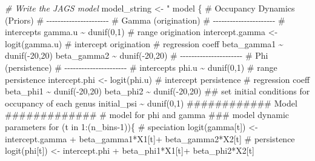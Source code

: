 \documentclass[
]{article}
\newenvironment{Shaded}{\begin{snugshade}}{\end{snugshade}}
\newcommand{\CommentTok}[1]{\textcolor[rgb]{0.56,0.35,0.01}{\textit{#1}}}
\newcommand{\NormalTok}[1]{#1}
\newcommand{\OtherTok}[1]{\textcolor[rgb]{0.56,0.35,0.01}{#1}}
\newcommand{\StringTok}[1]{\textcolor[rgb]{0.31,0.60,0.02}{#1}}
\begin{document}
{\begin{Shaded}
\begin{Highlighting}[]
\CommentTok{\# Write the JAGS model}
\NormalTok{model\_string }\OtherTok{\textless{}{-}} \StringTok{"}
\StringTok{model \{}
\StringTok{  }
\StringTok{      \#  Occupancy Dynamics (Priors)}
\StringTok{       }
\StringTok{       }
\StringTok{        \# {-}{-}{-}{-}{-}{-}{-}{-}{-}{-}{-}{-}{-}{-}{-}{-}{-}{-}{-}{-}{-}{-}}
\StringTok{        \#     Gamma (origination)}
\StringTok{        \# {-}{-}{-}{-}{-}{-}{-}{-}{-}{-}{-}{-}{-}{-}{-}{-}{-}{-}{-}{-}{-}{-}}
\StringTok{        }
\StringTok{        \# intercepts}
\StringTok{        gamma.u \textasciitilde{} dunif(0,1) \# range origination}
\StringTok{        intercept.gamma \textless{}{-} logit(gamma.u) \# intercept origination}
\StringTok{        }
\StringTok{        \# regression coeff}
\StringTok{        beta\_gamma1 \textasciitilde{} dunif({-}20,20)}
\StringTok{        beta\_gamma2 \textasciitilde{} dunif({-}20,20)}
\StringTok{        }
\StringTok{        \# {-}{-}{-}{-}{-}{-}{-}{-}{-}{-}{-}{-}{-}{-}{-}{-}{-}{-}{-}{-}{-}{-}}
\StringTok{        \#     Phi (persistence)}
\StringTok{        \# {-}{-}{-}{-}{-}{-}{-}{-}{-}{-}{-}{-}{-}{-}{-}{-}{-}{-}{-}{-}{-}{-}}
\StringTok{        \# intercepts}
\StringTok{        phi.u \textasciitilde{} dunif(0,1) \# range persistence}
\StringTok{        intercept.phi \textless{}{-} logit(phi.u) \# intercept persistence}
\StringTok{        }
\StringTok{        \# regression coeff}
\StringTok{        beta\_phi1 \textasciitilde{} dunif({-}20,20)}
\StringTok{        beta\_phi2 \textasciitilde{} dunif({-}20,20)}
\StringTok{       }
\StringTok{        \#\# set initial conditions for occupancy of each genus}
\StringTok{        initial\_psi \textasciitilde{} dunif(0,1)}
\StringTok{      }
\StringTok{       \#\#\#\#\#\#\#\#\#\#\#\#      Model       \#\#\#\#\#\#\#\#\#\#\#\#\#}
\StringTok{       }
\StringTok{       \# model for phi and gamma}
\StringTok{       \#\#\# model dynamic parameters}
\StringTok{        }
\StringTok{        for (t in 1:(n\_bins{-}1))\{}
\StringTok{      }
\StringTok{             \# speciation}
\StringTok{             logit(gamma[t]) \textless{}{-}  intercept.gamma + }
\StringTok{                                   beta\_gamma1*X1[t]+}
\StringTok{                                   beta\_gamma2*X2[t]}
\StringTok{                                   }
\StringTok{              \# persistence}
\StringTok{              logit(phi[t]) \textless{}{-}  intercept.phi + }
\StringTok{                                  beta\_phi1*X1[t]+}
\StringTok{                                  beta\_phi2*X2[t]}
\StringTok{                                  }
\StringTok{                                  }

\end{Highlighting}
\end{Shaded}}
\end{document}
